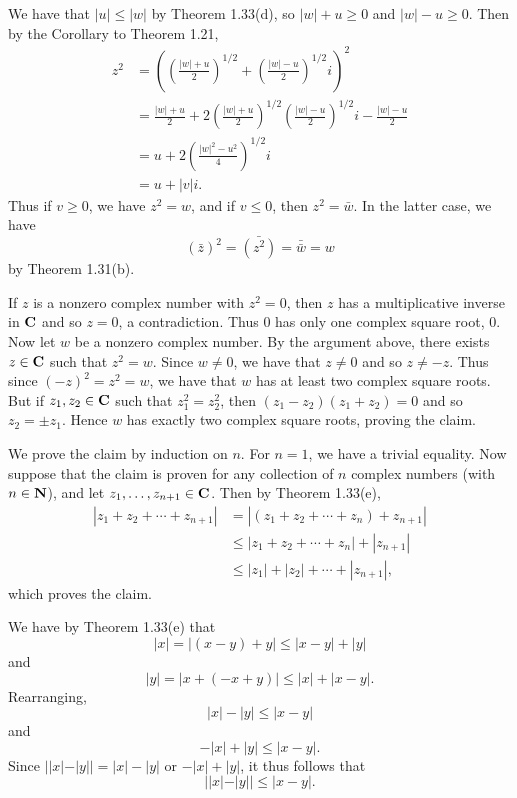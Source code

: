 \begin{ex}
We have that $|u| \leq |w|$ by Theorem 1.33(d), so $|w| + u \geq 0$ and $|w| - u \geq 0$. Then by the Corollary to Theorem 1.21,
\begin{align*}
z^2 & = \left(\left(\frac{|w| + u}{2}\right)^{1/2} + \left(\frac{|w| - u}{2}\right)^{1/2}i\right)^2\\
& = \frac{|w| + u}{2} + 2\left(\frac{|w| + u}{2}\right)^{1/2}\left(\frac{|w| - u}{2}\right)^{1/2}i - \frac{|w| - u}{2}\\
& = u + 2\left(\frac{|w|^2 - u^2}{4}\right)^{1/2}i\\
& = u + |v|i.
\end{align*}
Thus if $v \geq 0$, we have $z^2 = w$, and if $v \leq 0$, then $z^2 = \bar{w}$. In the latter case, we have \[(\bar{z})^2 = \bar{(z^2)} = \bar{\bar{w}} = w\] by Theorem 1.31(b).

If $z$ is a nonzero complex number with $z^2 = 0$, then $z$ has a multiplicative inverse in $\mathbf{C}$ and so $z = 0$, a contradiction. Thus $0$ has only one complex square root, $0$. Now let $w$ be a nonzero complex number. By the argument above, there exists $z \in \mathbf{C}$ such that $z^2 = w$. Since $w \not = 0$, we have that $z \not = 0$ and so $z \not = -z$. Thus since $(-z)^2 = z^2 = w$, we have that $w$ has at least two complex square roots. But if $z_1, z_2 \in \mathbf{C}$ such that $z_1^2 = z_2^2$, then $(z_1-z_2)(z_1+z_2) = 0$ and so $z_2 = \pm z_1$. Hence $w$ has exactly two complex square roots, proving the claim.
\end{ex}

\begin{ex}
[TODO]
\end{ex}

\begin{ex}
We prove the claim by induction on $n$. For $n = 1$, we have a trivial equality. Now suppose that the claim is proven for any collection of $n$ complex numbers (with $n \in \mathbf{N}$), and let $z_1, \ldots, z_{n+1} \in \mathbf{C}$. Then by Theorem 1.33(e),
\begin{align*}
|z_1 + z_2 + \cdots + z_{n+1}| & = |(z_1 + z_2 + \cdots + z_n) + z_{n+1}|\\
& \leq |z_1 + z_2 + \cdots + z_n| + |z_{n+1}|\\
& \leq |z_1| + |z_2| + \cdots + |z_{n+1}|,
\end{align*}
which proves the claim.
\end{ex}

\begin{ex}
We have by Theorem 1.33(e) that \[|x| = |(x-y) + y| \leq |x-y| + |y|\] and \[|y| = |x + (-x + y)| \leq |x| + |x-y|.\] Rearranging, \[|x| - |y| \leq |x-y|\] and \[-|x| + |y| \leq |x-y|.\] Since $||x| - |y|| = |x| - |y|$ or $-|x| + |y|$, it thus follows that \[||x| - |y|| \leq |x-y|.\]
\end{ex}

